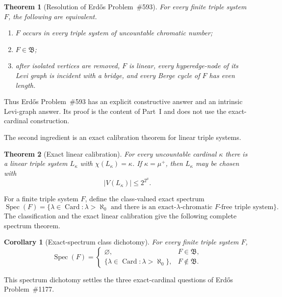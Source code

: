 \documentclass[11pt]{amsart}
\newtheorem{theorem}{Theorem}[section]
\newtheorem{corollary}[corollary]{Corollary}
\theoremstyle{definition}
\theoremstyle{remark}
\numberwithin{equation}{section}
\DeclareMathOperator{\Spec}{Spec}
\DeclareMathOperator{\Card}{Card}
\newcommand{\Bclass}{\mathfrak B}
\begin{document}
\begin{theorem}[Resolution of Erd\H{o}s Problem~\#593]
\label{thm:intro-classification}
For every finite triple system $F$, the following are equivalent.
\begin{enumerate}[label=\textup{(\roman*)}]
\item $F$ occurs in every triple system of uncountable chromatic number;
\item $F\in\Bclass$;
\item after isolated vertices are removed, $F$ is linear, every
hyperedge-node of its Levi graph is incident with a bridge, and every
Berge cycle of $F$ has even length.
\end{enumerate}
\end{theorem}

Thus Erd\H{o}s Problem~\#593 has an explicit constructive answer and an
intrinsic Levi-graph answer.  Its proof is the content of Part~I and does not
use the exact-cardinal construction.

The second ingredient is an exact calibration theorem for linear triple systems.

\begin{theorem}[Exact linear calibration]
\label{thm:intro-linear}
For every uncountable cardinal $\kappa$ there is a linear triple system
$L_\kappa$ with $\chi(L_\kappa)=\kappa$.  If $\kappa=\mu^+$, then
$L_\kappa$ may be chosen with
\[
  |V(L_\kappa)|\le 2^{2^\mu}.
\]
\end{theorem}

For a finite triple system $F$, define the class-valued exact spectrum
\[
\Spec(F)=\{\lambda\in\Card:\lambda>\aleph_0\text{ and there is an
exact-$\lambda$-chromatic $F$-free triple system}\}.
\]
The classification and the exact linear calibration give the following complete
spectrum theorem.

\begin{corollary}[Exact-spectrum class dichotomy]
\label{thm:intro-spectrum}
For every finite triple system $F$,
\[
\Spec(F)=
\begin{cases}
\varnothing,&F\in\Bclass,\\[2mm]
\{\lambda\in\Card:\lambda>\aleph_0\},&F\notin\Bclass.
\end{cases}
\]
\end{corollary}

This spectrum dichotomy settles the three exact-cardinal questions of
Erd\H{o}s Problem~\#1177.
\end{document}
